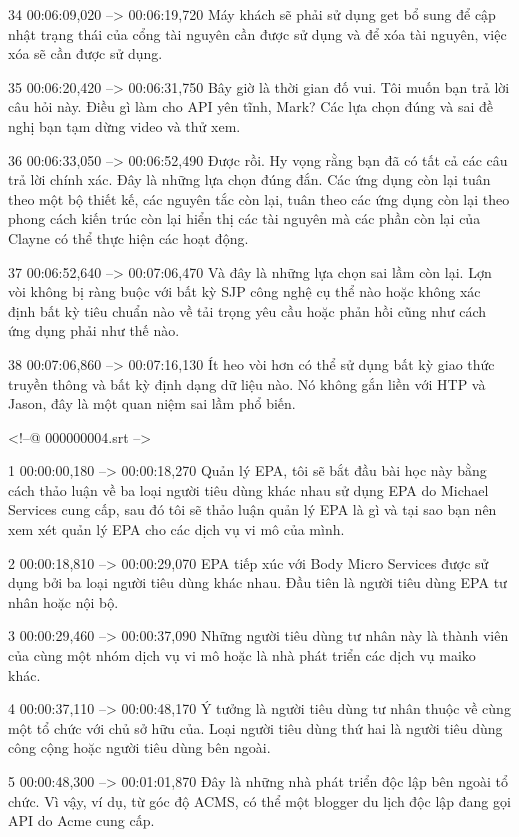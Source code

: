 34
00:06:09,020 --> 00:06:19,720
Máy khách sẽ phải sử dụng get bổ sung để cập nhật trạng thái của cổng tài nguyên cần được sử dụng và để xóa tài nguyên, việc xóa sẽ cần được sử dụng.

35
00:06:20,420 --> 00:06:31,750
Bây giờ là thời gian đố vui.  Tôi muốn bạn trả lời câu hỏi này.  Điều gì làm cho API yên tĩnh, Mark?  Các lựa chọn đúng và sai đề nghị bạn tạm dừng video và thử xem.

36
00:06:33,050 --> 00:06:52,490
Được rồi.  Hy vọng rằng bạn đã có tất cả các câu trả lời chính xác.  Đây là những lựa chọn đúng đắn.  Các ứng dụng còn lại tuân theo một bộ thiết kế, các nguyên tắc còn lại, tuân theo các ứng dụng còn lại theo phong cách kiến ​​trúc còn lại hiển thị các tài nguyên mà các phần còn lại của Clayne có thể thực hiện các hoạt động.

37
00:06:52,640 --> 00:07:06,470
Và đây là những lựa chọn sai lầm còn lại.  Lợn vòi không bị ràng buộc với bất kỳ SJP công nghệ cụ thể nào hoặc không xác định bất kỳ tiêu chuẩn nào về tải trọng yêu cầu hoặc phản hồi cũng như cách ứng dụng phải như thế nào.

38
00:07:06,860 --> 00:07:16,130
Ít heo vòi hơn có thể sử dụng bất kỳ giao thức truyền thông và bất kỳ định dạng dữ liệu nào.  Nó không gắn liền với HTP và Jason, đây là một quan niệm sai lầm phổ biến.

<!--@ 000000004.srt -->

1
00:00:00,180 --> 00:00:18,270
Quản lý EPA, tôi sẽ bắt đầu bài học này bằng cách thảo luận về ba loại người tiêu dùng khác nhau sử dụng EPA do Michael Services cung cấp, sau đó tôi sẽ thảo luận quản lý EPA là gì và tại sao bạn nên xem xét quản lý EPA cho các dịch vụ vi mô của mình.

2
00:00:18,810 --> 00:00:29,070
EPA tiếp xúc với Body Micro Services được sử dụng bởi ba loại người tiêu dùng khác nhau.  Đầu tiên là người tiêu dùng EPA tư nhân hoặc nội bộ.

3
00:00:29,460 --> 00:00:37,090
Những người tiêu dùng tư nhân này là thành viên của cùng một nhóm dịch vụ vi mô hoặc là nhà phát triển các dịch vụ maiko khác.

4
00:00:37,110 --> 00:00:48,170
Ý tưởng là người tiêu dùng tư nhân thuộc về cùng một tổ chức với chủ sở hữu của.  Loại người tiêu dùng thứ hai là người tiêu dùng công cộng hoặc người tiêu dùng bên ngoài.

5
00:00:48,300 --> 00:01:01,870
Đây là những nhà phát triển độc lập bên ngoài tổ chức.  Vì vậy, ví dụ, từ góc độ ACMS, có thể một blogger du lịch độc lập đang gọi API do Acme cung cấp.

